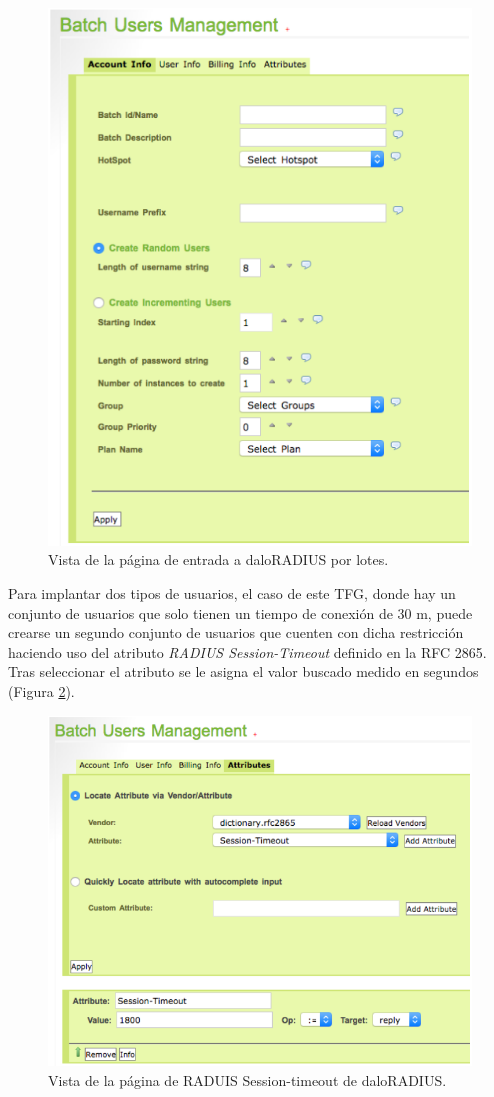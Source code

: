 \begin{figure}[!t]
\begin{center}
\includegraphics[width=0.75\linewidth]{./5_AnalisisOrganico/Img/daloBatchUsers.png}
\end{center}
\caption{Vista de la página de entrada a daloRADIUS por lotes.}
\label{daloBatchUsers}
\end{figure}

Para implantar dos tipos de usuarios, el caso de este TFG, donde hay un conjunto de usuarios que solo tienen un tiempo de conexión de 30 m, puede crearse un segundo conjunto de usuarios que cuenten con dicha restricción haciendo uso del atributo \emph{RADIUS Session-Timeout} definido en la RFC 2865. Tras seleccionar el atributo se le asigna el valor buscado medido en segundos (Figura \ref{daloBatchUsersMan}).

\begin{figure}[!t]
\begin{center}
\includegraphics[width=0.75\linewidth]{./5_AnalisisOrganico/Img/daloBatchUsersMan.png}
\end{center}
\caption{Vista de la página de RADUIS Session-timeout de daloRADIUS.}
\label{daloBatchUsersMan}
\end{figure}

